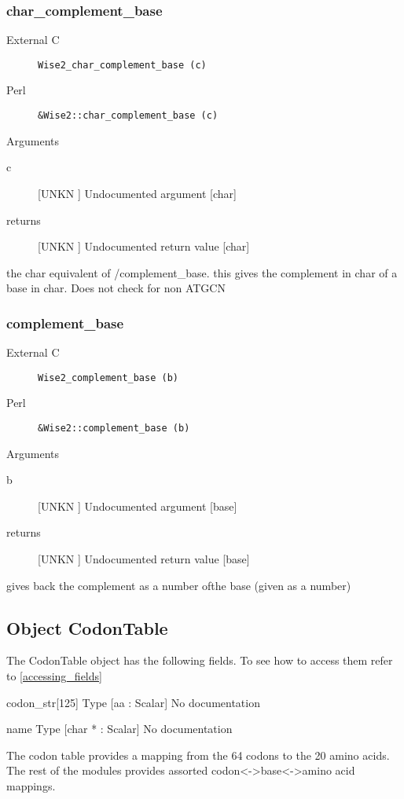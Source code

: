 \subsubsection{char_complement_base}
\begin{description}
\item[External C] {\tt Wise2_char_complement_base (c)}
\item[Perl] {\tt &Wise2::char_complement_base (c)}

\end{description}
Arguments
\begin{description}
\item[c] [UNKN ] Undocumented argument [char]
\item[returns] [UNKN ] Undocumented return value [char]
\end{description}
the char equivalent of /complement_base.
this gives the complement in char of a base
in char. Does not check for non ATGCN


\subsubsection{complement_base}
\begin{description}
\item[External C] {\tt Wise2_complement_base (b)}
\item[Perl] {\tt &Wise2::complement_base (b)}

\end{description}
Arguments
\begin{description}
\item[b] [UNKN ] Undocumented argument [base]
\item[returns] [UNKN ] Undocumented return value [base]
\end{description}
gives back the complement as a number
ofthe base (given as a number)




\subsection{Object CodonTable}

\label{object_CodonTable}

The CodonTable object has the following fields. To see how to access them refer to \ref{accessing_fields}
\begin{description}
\item{codon_str[125]} Type [aa : Scalar] No documentation

\item{name} Type [char * : Scalar] No documentation

\end{description}
The codon table provides a mapping from the 64 codons to the 20 amino
acids. The rest of the modules provides assorted codon<->base<->amino
acid mappings.


